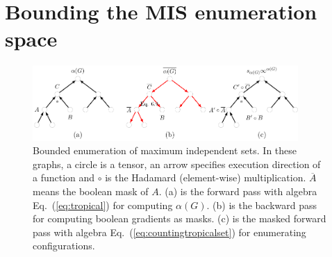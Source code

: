 \documentclass[onefignum, onetabnum]{siamart190516}
\newcommand{\<}{\langle}
\renewcommand{\>}{\rangle}
\newcommand{\Eq}[1]{Eq.~(\ref{#1})}
\begin{document}
\section{Bounding the MIS enumeration space}\label{sec:bounding}
\begin{figure}
    \centering
    \includegraphics[width=0.9\textwidth, trim={0cm 0cm 0cm 0cm}, clip]{figures/masktree.pdf}
    \caption{Bounded enumeration of maximum independent sets. In these graphs, a circle is a tensor, an arrow specifies execution direction of a function and $\circ$ is the Hadamard (element-wise) multiplication. $\overline A$ means the boolean mask of $A$. (a) is the forward pass with algebra \Eq{eq:tropical} for computing $\alpha(G)$.
     (b) is the backward pass for computing boolean gradients as masks.
     (c) is the masked forward pass with algebra \Eq{eq:countingtropicalset} for enumerating configurations.}
     \label{fig:bounding}
\end{figure}
\end{document}

